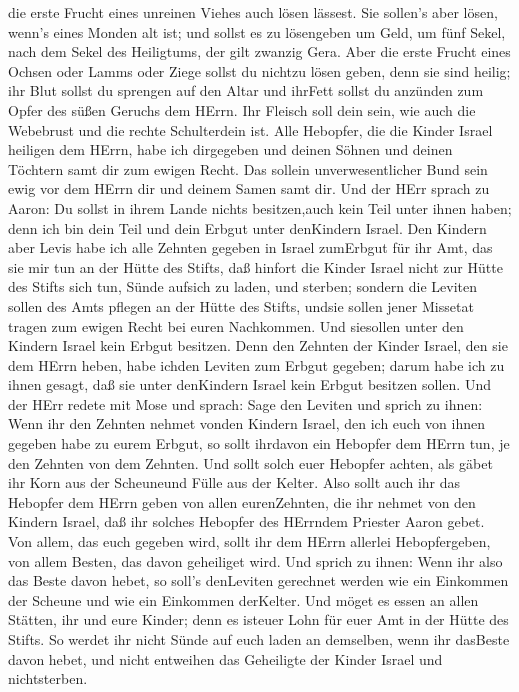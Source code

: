 die erste Frucht eines unreinen Viehes auch lösen lässest. 
Sie sollen's aber lösen, wenn's eines Monden alt ist; und sollst es zu
lösengeben um Geld, um fünf Sekel, nach dem Sekel des Heiligtums, der
gilt zwanzig Gera.  Aber die erste Frucht eines Ochsen oder
Lamms oder Ziege sollst du nichtzu lösen geben, denn sie sind heilig;
ihr Blut sollst du sprengen auf den Altar und ihrFett sollst du anzünden
zum Opfer des süßen Geruchs dem HErrn.  Ihr Fleisch soll
dein sein, wie auch die Webebrust und die rechte Schulterdein ist.
 Alle Hebopfer, die die Kinder Israel heiligen dem HErrn,
habe ich dirgegeben und deinen Söhnen und deinen Töchtern samt dir zum
ewigen Recht. Das sollein unverwesentlicher Bund sein ewig vor dem HErrn
dir und deinem Samen samt dir.  Und der HErr sprach zu
Aaron: Du sollst in ihrem Lande nichts besitzen,auch kein Teil unter
ihnen haben; denn ich bin dein Teil und dein Erbgut unter denKindern
Israel.  Den Kindern aber Levis habe ich alle Zehnten
gegeben in Israel zumErbgut für ihr Amt, das sie mir tun an der Hütte
des Stifts,  daß hinfort die Kinder Israel nicht zur Hütte
des Stifts sich tun, Sünde aufsich zu laden, und sterben; 
sondern die Leviten sollen des Amts pflegen an der Hütte des Stifts,
undsie sollen jener Missetat tragen zum ewigen Recht bei euren
Nachkommen. Und siesollen unter den Kindern Israel kein Erbgut besitzen.
 Denn den Zehnten der Kinder Israel, den sie dem HErrn
heben, habe ichden Leviten zum Erbgut gegeben; darum habe ich zu ihnen
gesagt, daß sie unter denKindern Israel kein Erbgut besitzen sollen.
 Und der HErr redete mit Mose und sprach: 
Sage den Leviten und sprich zu ihnen: Wenn ihr den Zehnten nehmet vonden
Kindern Israel, den ich euch von ihnen gegeben habe zu eurem Erbgut, so
sollt ihrdavon ein Hebopfer dem HErrn tun, je den Zehnten von dem
Zehnten.  Und sollt solch euer Hebopfer achten, als gäbet
ihr Korn aus der Scheuneund Fülle aus der Kelter.  Also
sollt auch ihr das Hebopfer dem HErrn geben von allen eurenZehnten, die
ihr nehmet von den Kindern Israel, daß ihr solches Hebopfer des HErrndem
Priester Aaron gebet.  Von allem, das euch gegeben wird,
sollt ihr dem HErrn allerlei Hebopfergeben, von allem Besten, das davon
geheiliget wird.  Und sprich zu ihnen: Wenn ihr also das
Beste davon hebet, so soll's denLeviten gerechnet werden wie ein
Einkommen der Scheune und wie ein Einkommen derKelter.  Und
möget es essen an allen Stätten, ihr und eure Kinder; denn es isteuer
Lohn für euer Amt in der Hütte des Stifts.  So werdet ihr
nicht Sünde auf euch laden an demselben, wenn ihr dasBeste davon hebet,
und nicht entweihen das Geheiligte der Kinder Israel und nichtsterben.

